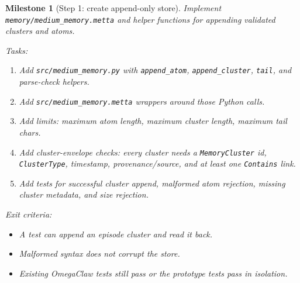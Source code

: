 \documentclass[11pt]{article}
\newtheorem{milestone}{Milestone}
\begin{document}
\begin{milestone}[Step 1: create append-only store]
Implement \texttt{memory/medium\_memory.metta} and helper functions for appending
validated clusters and atoms.

Tasks:
\begin{enumerate}
  \item Add \texttt{src/medium\_memory.py} with \texttt{append\_atom},
        \texttt{append\_cluster}, \texttt{tail}, and parse-check helpers.
  \item Add \texttt{src/medium\_memory.metta} wrappers around those Python calls.
  \item Add limits: maximum atom length, maximum cluster length, maximum tail chars.
  \item Add cluster-envelope checks: every cluster needs a \texttt{MemoryCluster} id,
        \texttt{ClusterType}, timestamp, provenance/source, and at least one
        \texttt{Contains} link.
  \item Add tests for successful cluster append, malformed atom rejection, missing
        cluster metadata, and size rejection.
\end{enumerate}

Exit criteria:
\begin{itemize}
  \item A test can append an episode cluster and read it back.
  \item Malformed syntax does not corrupt the store.
  \item Existing OmegaClaw tests still pass or the prototype tests pass in isolation.
\end{itemize}
\end{milestone}
\end{document}
